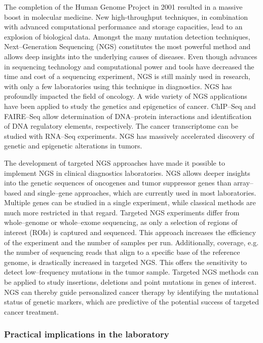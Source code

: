 {{     The completion of the Human Genome Project in 2001 resulted in a massive
    boost in molecular medicine. New high-throughput techniques, in combination
    with advanced computational performance and storage capacities, lead to an
    explosion of biological data. Amongst the many mutation detection
    techniques, Next--Generation Sequencing (NGS) constitutes the most powerful
    method and allows deep insights into the underlying causes of diseases.
    Even though advances in sequencing technology and computational power and
    tools have decreased the time and cost of a sequencing experiment, NGS is
    still mainly used in research, with only a few laboratories using this
    technique in diagnostics. NGS has profoundly impacted the field of
    oncology. A wide variety of NGS applications have been applied to study the
    genetics and epigenetics of cancer. ChIP--Seq and FAIRE--Seq allow
    determination of DNA--protein interactions and identification of DNA
    regulatory elements, respectively. The cancer transcriptome can be studied
    with RNA--Seq experiments. NGS has massively accelerated discovery of
    genetic and epigenetic alterations in tumors.

    The development of targeted NGS approaches have made it possible to
    implement NGS in clinical diagnostics laboratories. NGS allows deeper
    insights into the genetic sequences of oncogenes and tumor suppressor
    genes than array--based and single--gene approaches, which are currently
    used in most laboratories. Multiple genes can be studied in a single
    experiment, while classical methods are much more restricted in that
    regard. Targeted NGS experiments differ from whole--genome or whole--exome
    sequencing, as only a selection of regions of interest (ROIs) is captured
    and sequenced. This approach increases the efficiency of the experiment
    and the number of samples per run. Additionally, coverage, e.g. the number
    of sequencing reads that align to a specific base of the reference genome,
    is drastically increased in targeted NGS. This offers the sensitivity to
    detect low--frequency mutations in the tumor sample. Targeted NGS methods
    can be applied to study insertions, deletions and point mutations in genes
    of interest. NGS can thereby guide personalized cancer therapy by
    identifying the mutational status of genetic markers, which are predictive
    of the potential success of targeted cancer treatment.

    \subsubsection{Practical implications in the laboratory}

}}
